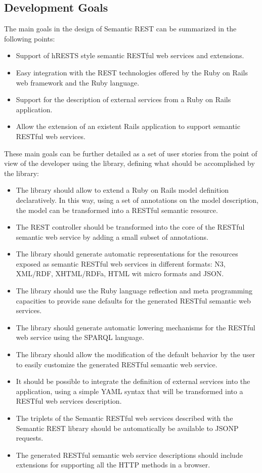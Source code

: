 \subsection{Development Goals}

The main goals in the design of Semantic REST can be summarized in the following points:

\begin{itemize}
  \item Support of hRESTS style semantic RESTful web services and extensions.
  \item Easy integration with the REST technologies offered by the Ruby on Rails web framework and the Ruby language.
  \item Support for the description of external services from a Ruby on Rails application.
  \item Allow the extension of an existent Rails application to support semantic RESTful web services.
\end{itemize}


These main goals can be further detailed as a set of user stories from the point of view of the developer using the library, defining what should be accomplished by the library:

\begin{itemize}
  \item The library should allow to extend a Ruby on Rails model definition declaratively. In this way, using a set of
    annotations on the model description, the model can be transformed into a RESTful semantic resource.
 \item The REST controller should be transformed into the core of the RESTful semantic web service by
   adding a small subset of annotations.
\item The library should generate automatic representations for the resources exposed as semantic RESTful web services
  in different formats: N3, XML/RDF, XHTML/RDFa, HTML wit micro formats and JSON.
\item The library should use the Ruby language reflection and meta programming capacities to provide sane defaults for
  the generated RESTful semantic web services.
\item The library should generate automatic lowering mechanisms for the RESTful web service using the SPARQL language.
\item The library should allow the modification of the default behavior by the user to easily customize the generated RESTful
  semantic web service.
\item It should be possible to integrate the definition of external services into the application, using a simple YAML syntax that will be
  transformed into a RESTful web services description.
\item  The triplets of the Semantic RESTful web services described with the Semantic REST library should be
  automatically be available to JSONP requests.
\item The generated RESTful semantic web service descriptions should include extensions for  supporting all the HTTP
  methods in a browser.
\end{itemize}


